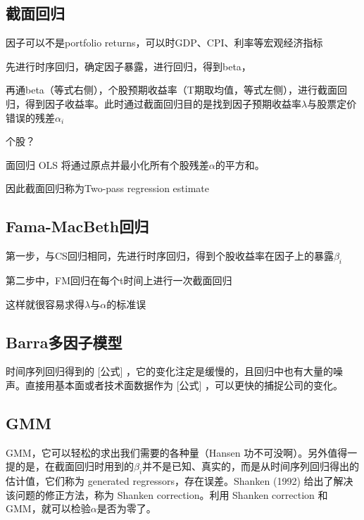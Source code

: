 \documentclass[11pt]{article}
\begin{document}
\subsection{截面回归}

因子可以不是portfolio returns，可以时GDP、CPI、利率等宏观经济指标

先进行时序回归，确定因子暴露，进行回归，得到beta，


再通beta（等式右侧），个股预期收益率（T期取均值，等式左侧），进行截面回归，得到因子收益率。此时通过截面回归目的是找到因子预期收益率$\lambda$与股票定价错误的残差$\alpha_i$

个股？

面回归 OLS 将通过原点并最小化所有个股残差$\alpha$的平方和。

因此截面回归称为Two-pass regression estimate

\subsection{Fama-MacBeth回归}

第一步，与CS回归相同，先进行时序回归，得到个股收益率在因子上的暴露$\beta_i$

第二步中，FM回归在每个t时间上进行一次截面回归

这样就很容易求得$\lambda$与$\alpha$的标准误

\subsection{Barra多因子模型}

时间序列回归得到的 [公式] ，它的变化注定是缓慢的，且回归中也有大量的噪声。直接用基本面或者技术面数据作为 [公式] ，可以更快的捕捉公司的变化。

\subsection{GMM}

 GMM，它可以轻松的求出我们需要的各种量（Hansen 功不可没啊）。另外值得一提的是，在截面回归时用到的$\beta_i$并不是已知、真实的，而是从时间序列回归得出的估计值，它们称为 generated regressors，存在误差。Shanken (1992) 给出了解决该问题的修正方法，称为 Shanken correction。利用 Shanken correction 和 GMM，就可以检验$\alpha$是否为零了。

\appendix
\end{document}
